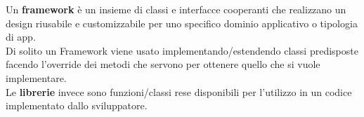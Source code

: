 Un \textbf{framework} è un insieme di classi e interfacce cooperanti che realizzano un design riusabile e customizzabile per uno specifico dominio applicativo o tipologia di app.\\
Di solito un Framework viene usato implementando/estendendo classi predisposte facendo l'override dei metodi che servono per ottenere quello che si vuole implementare.\\
Le \textbf{librerie} invece sono funzioni/classi rese disponibili per l'utilizzo in un codice implementato dallo sviluppatore.